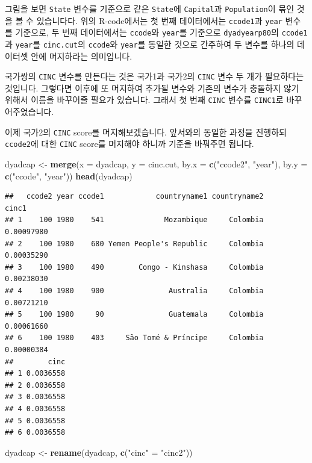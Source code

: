 \documentclass[]{book}
\newenvironment{Shaded}{\begin{snugshade}}{\end{snugshade}}
\newcommand{\DataTypeTok}[1]{\textcolor[rgb]{0.13,0.29,0.53}{#1}}
\newcommand{\KeywordTok}[1]{\textcolor[rgb]{0.13,0.29,0.53}{\textbf{#1}}}
\newcommand{\NormalTok}[1]{#1}
\newcommand{\StringTok}[1]{\textcolor[rgb]{0.31,0.60,0.02}{#1}}
\begin{document}
그림을 보면 \texttt{State} 변수를 기준으로 같은 \texttt{State}에 \texttt{Capital}과 \texttt{Population}이 묶인 것을 볼 수 있습니다다. 위의 R-code에서는 첫 번째 데이터에서는 \texttt{ccode1}과 \texttt{year} 변수를 기준으로, 두 번째 데이터에서는 \texttt{ccode}와 \texttt{year}를 기준으로 \texttt{dyadyearp80}의 \texttt{ccode1}과 \texttt{year}를 \texttt{cinc.cut}의 \texttt{ccode}와 \texttt{year}를 동일한 것으로 간주하여 두 변수를 하나의 데이터셋 안에 머지하라는 의미입니다.

국가쌍의 \texttt{CINC} 변수를 만든다는 것은 국가1과 국가2의 \texttt{CINC} 변수 두 개가 필요하다는 것입니다. 그렇다면 이후에 또 머지하여 추가될 변수와 기존의 변수가 충돌하지 않기 위해서 이름을 바꾸어줄 필요가 있습니다. 그래서 첫 번째 \texttt{CINC} 변수를 \texttt{CINC1}로 바꾸어주었습니다.

이제 국가2의 \texttt{CINC} score를 머지해보겠습니다. 앞서와의 동일한 과정을 진행하되 \texttt{ccode2}에 대한 \texttt{CINC} score를 머지해야 하니까 기준을 바꿔주면 됩니다.

\begin{Shaded}
\begin{Highlighting}[]
\NormalTok{dyadcap <-}\StringTok{ }\KeywordTok{merge}\NormalTok{(}\DataTypeTok{x =}\NormalTok{ dyadcap, }
                 \DataTypeTok{y =}\NormalTok{ cinc.cut, }
                 \DataTypeTok{by.x =} \KeywordTok{c}\NormalTok{(}\StringTok{"ccode2"}\NormalTok{, }\StringTok{"year"}\NormalTok{), }
                 \DataTypeTok{by.y =} \KeywordTok{c}\NormalTok{(}\StringTok{"ccode"}\NormalTok{, }\StringTok{"year"}\NormalTok{))}
\KeywordTok{head}\NormalTok{(dyadcap)}
\end{Highlighting}
\end{Shaded}

\begin{verbatim}
##   ccode2 year ccode1            countryname1 countryname2      cinc1
## 1    100 1980    541              Mozambique     Colombia 0.00097980
## 2    100 1980    680 Yemen People's Republic     Colombia 0.00035290
## 3    100 1980    490        Congo - Kinshasa     Colombia 0.00238030
## 4    100 1980    900               Australia     Colombia 0.00721210
## 5    100 1980     90               Guatemala     Colombia 0.00061660
## 6    100 1980    403     São Tomé & Príncipe     Colombia 0.00000384
##        cinc
## 1 0.0036558
## 2 0.0036558
## 3 0.0036558
## 4 0.0036558
## 5 0.0036558
## 6 0.0036558
\end{verbatim}

\begin{Shaded}
\begin{Highlighting}[]
\NormalTok{dyadcap <-}\StringTok{ }\KeywordTok{rename}\NormalTok{(dyadcap, }\KeywordTok{c}\NormalTok{(}\StringTok{"cinc"}\NormalTok{ =}\StringTok{ "cinc2"}\NormalTok{))}
\end{Highlighting}
\end{Shaded}
\end{document}
